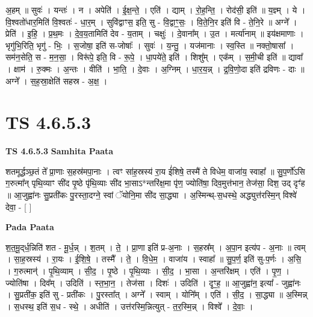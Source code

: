 \documentclass[17pt]{extarticle}
\begin{document}
अ॒हम् ॥ सुवः॑ । यन्तः॑ । न । अपेति॑ । ई॒क्ष॒न्ते॒ । एति॑ । द्याम् । रो॒ह॒न्ति॒ । रोद॑सी॒ इति॑ ॥ य॒ज्ञ्म् । ये । वि॒श्वतो॑धार॒मिति॑ वि॒श्वतः॑ - धा॒र॒म् । सुवि॑द्वाꣳस॒ इति॒ सु - वि॒द्वाꣳ॒॒सः॒ । वि॒ते॒नि॒र इति॑ वि - ते॒नि॒रे ॥ अग्ने᳚ । प्रेति॑ । इ॒हि॒ । प्र॒थ॒मः । दे॒व॒य॒तामिति॑ देव - य॒ताम् । चक्षुः॑ । दे॒वाना᳚म् । उ॒त । मर्त्या॑नाम् ॥ इय॑क्षमाणाः । भृगु॑भि॒रिति॒ भृगु॑ - भिः॒ । स॒जोषा॒ इति॑ स-जोषाः᳚ । सुवः॑ । य॒न्तु॒ । यज॑मानाः । स्व॒स्ति ॥ नक्तो॒षासा᳚ । सम॑न॒सेति॒ स - म॒न॒सा॒ । विरू॑पे॒ इति॒ वि - रू॒पे॒ । धा॒पये॑ते॒ इति॑ । शिशु᳚म् । एक᳚म् । स॒मी॒ची इति॑ ॥ द्यावा᳚ । क्षाम॑ । रु॒क्मः । अ॒न्तः । वीति॑ । भा॒ति॒ । दे॒वाः । अ॒ग्निम् । धा॒र॒य॒न्न् । द्र॒वि॒णो॒दा इति॑ द्रविणः - दाः ॥ अग्ने᳚ । स॒ह॒स्रा॒क्षेति॑ सहस्र - अ॒क्ष॒ ।  \newline




\section*{ TS 4.6.5.3 }

\textbf{TS 4.6.5.3 } \newline
\textbf{Samhita Paata} \newline

शतमूर्द्धञ्छ॒तं ते᳚ प्रा॒णाः स॒हस्र॑मपा॒नाः । त्वꣳ सा॑ह॒स्रस्य॑ रा॒य ई॑शिषे॒ तस्मै॑ ते विधेम॒ वाजा॑य॒ स्वाहा᳚ ॥ सु॒प॒र्णो॑ऽसि ग॒रुत्मा᳚न् पृथि॒व्याꣳ सी॑द पृ॒ष्ठे पृ॑थि॒व्याः सी॑द भा॒साऽ*न्तरि॑क्ष॒मा पृ॑ण॒ ज्योति॑षा॒ दिव॒मुत्त॑भान॒ तेज॑सा॒ दिश॒ उद् दृꣳ॑ह ॥ आ॒जुह्वा॑नः सु॒प्रती॑कः पु॒रस्ता॒दग्ने॒ स्वां ॅयोनि॒मा सी॑द सा॒द्ध्या । अ॒स्मिन्थ्-स॒धस्थे॒ अद्ध्युत्त॑रस्मि॒न् विश्वे॑ देवा॒ - [  ] \newline

\textbf{Pada Paata} \newline

श॒त॒मू॒द्‌र्ध॒न्निति॑ शत - मू॒र्ध॒न्न् । श॒तम् । ते॒ । प्रा॒णा इति॑ प्र-अ॒नाः । स॒हस्र᳚म् । अ॒पा॒न इत्य॑प - अ॒नाः ॥ त्वम् । सा॒ह॒स्रस्य॑ । रा॒यः । ई॒शि॒षे॒ । तस्मै᳚ । ते॒ । वि॒धे॒म॒ । वाजा॑य । स्वाहा᳚ ॥ सु॒प॒र्ण॒ इति॑ सु-प॒र्णः । अ॒सि॒ । ग॒रुत्मान्॑ । पृ॒थि॒व्याम् । सी॒द॒ । पृ॒ष्ठे । पृ॒थि॒व्याः । सी॒द॒ । भा॒सा । अ॒न्तरि॑क्षम् । एति॑ । पृ॒ण॒ । ज्योति॑षा । दिव᳚म् । उदिति॑ । स्त॒भा॒न॒ । तेज॑सा । दिशः॑ । उदिति॑ । दृꣳ॒॒ह॒ ॥ आ॒जुह्वा॑न॒ इत्या᳚ - जुह्वा॑नः । सु॒प्रती॑क॒ इति॑ सु - प्रती॑कः । पु॒रस्ता᳚त् । अग्ने᳚ । स्वाम् । योनि᳚म् । एति॑ । सी॒द॒ । सा॒द्ध्या ॥ अ॒स्मिन्न् । स॒धस्थ॒ इति॑ स॒ध - स्थे॒ । अधीति॑ । उत्त॑रस्मि॒न्नित्युत् - त॒र॒स्मि॒न्न् । विश्वे᳚ । दे॒वाः॒ ।  \newline
\end{document}
